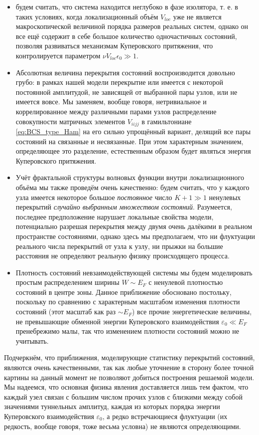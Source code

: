 \begin{itemize}
	\item будем считать, что система находится неглубоко в фазе изолятора, т. е. в таких условиях, когда локализационный объём $V_{loc}$ уже не является макроскопической величиной порядка размеров  реальных систем, однако он все ещё содержит в себе большое количество одночастичных состояний, позволяя развиваться механизмам Куперовского притяжения, что контролируется параметром $\nu V_{loc} \epsilon_0 \gg 1$.
	\item Абсолютная величина перекрытия состояний воспроизводится довольно грубо: в рамках нашей модели перекрытие или имеется с некоторой постоянной амплитудой, не зависящей от выбранной пары узлов, или не имеется вовсе. Мы заменяем, вообще говоря, нетривиальное и коррелированное между различными парами узлов распределение совокупности матричных элементов $V_{iijj}$ в гамильтониане \eqref{eq:BCS_type_Ham} на его сильно упрощённый вариант, делящий все пары состояний на связанные и несвязанные. При этом характерным значением, определяющее это разделение, естественным образом будет являться энергия Куперовского притяжения.
	\item Учёт фрактальной структуры волновых функции внутри локализационного объёма мы также проведём очень качественно: будем считать, что у каждого узла имеется некоторое большое \textit{постоянное} число $K + 1 \gg 1$ ненулевых перекрытий \textit{случайно выбранным множеством состояний}. Разумеется, последнее предположение нарушает локальные свойства модели, потенциально разрешая перекрытия между двумя очень далёкими в реальном пространстве состояниями, однако здесь мы предполагаем, что ни флуктуации реального числа перекрытий от узла к узлу, ни  прыжки на большие расстояния не определяют реальную физику происходящего процесса.
	\item Плотность состояний невзаимодействующей системы мы будем моделировать простым распределением ширины $W \sim E_F$ с ненулевой плотностью состояний в центре зоны. Данное приближение обосновано постольку, поскольку по сравнению с характерным масштабом изменения плотности состояний (этот масштаб как раз $\sim E_F$) все прочие энергетические величины, не превышающие обменной энергии Куперовского взаимодействия $\varepsilon_0 \ll E_F$ пренебрежимо малы, так что изменением плотности состояний можно не учитывать. 
\end{itemize}
Подчеркнём, что приближения, моделирующие статистику перекрытий состояний, являются очень качественными, так как любые уточнение в сторону более точной картины на данный момент не позволяют добиться построения решаемой модели. Мы надеемся, что основная физика явления доставляется лишь тем фактом, что каждый узел связан с большим числом прочих узлов с близкими между собой значениями туннельных амплитуд, каждая из которых порядка энергии Куперовского взаимодействия $\varepsilon_0$, а редко встречающиеся флуктуации (их редкость, вообще говоря, тоже весьма условна) не являются определяющими.


